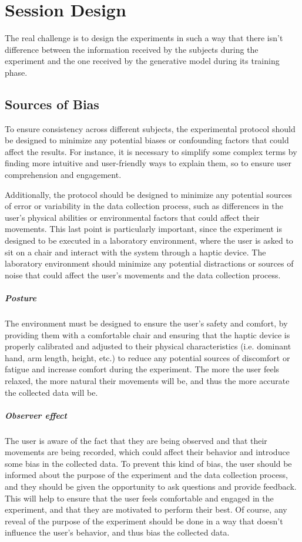 \documentclass[12pt]{report}
\begin{document}
\section{Session Design}
The real challenge is to design the experiments in such a way that there isn't difference between the information received by the subjects during the experiment and the one received by the generative model during its training phase.
\subsection{Sources of Bias}
To ensure consistency across different subjects, the experimental protocol should be designed to minimize any potential biases or confounding factors that could affect the results. For instance, it is necessary to simplify some complex terms by finding more intuitive and user-friendly ways to explain them, so to ensure user comprehension and engagement. 

Additionally, the protocol should be designed to minimize any potential sources of error or variability in the data collection process, such as differences in the user's physical abilities or environmental factors that could affect their movements. This last point is particularly important, since the experiment is designed to be executed in a laboratory environment, where the user is asked to sit on a chair and interact with the system through a haptic device. The laboratory environment should minimize any potential distractions or sources of noise that could affect the user's movements and the data collection process. 

\subparagraph{Posture} The environment must be designed to ensure the user's safety and comfort, by providing them with a comfortable chair and ensuring that the haptic device is properly calibrated and adjusted to their physical characteristics (i.e. dominant hand, arm length, height, etc.) to reduce any potential sources of discomfort or fatigue and increase comfort during the experiment. The more the user feels relaxed, the more natural their movements will be, and thus the more accurate the collected data will be. 

\subparagraph{Observer effect} The user is aware of the fact that they are being observed and that their movements are being recorded, which could affect their behavior and introduce some bias in the collected data. To prevent this kind of bias, the user should be informed about the purpose of the experiment and the data collection process, and they should be given the opportunity to ask questions and provide feedback. This will help to ensure that the user feels comfortable and engaged in the experiment, and that they are motivated to perform their best. Of course, any reveal of the purpose of the experiment should be done in a way that doesn't influence the user's behavior, and thus bias the collected data.
\end{document}
